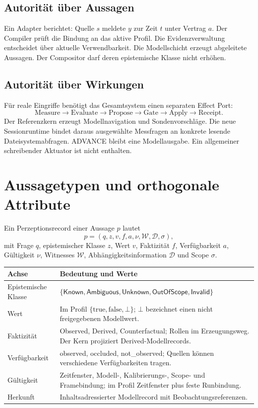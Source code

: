\documentclass[11pt,a4paper]{article}
\newcommand{\Known}{\ensuremath{\mathsf{Known}}}
\newcommand{\Unknown}{\ensuremath{\mathsf{Unknown}}}
\newcommand{\Ambiguous}{\ensuremath{\mathsf{Ambiguous}}}
\newcommand{\Invalid}{\ensuremath{\mathsf{Invalid}}}
\newcommand{\OOS}{\ensuremath{\mathsf{OutOfScope}}}
\newcommand{\nextsection}[2]{\clearpage{\color{accent}\small\textsf{#1}}\section{#2}}
\begin{document}
\subsection{Autorität über Aussagen}
Ein Adapter berichtet: Quelle $s$ meldete $y$ zur Zeit $t$ unter
Vertrag $a$. Der Compiler prüft die Bindung an das aktive Profil.
Die Evidenzverwaltung entscheidet über aktuelle Verwendbarkeit.
Die Modellschicht erzeugt abgeleitete Aussagen. Der Compositor darf
deren epistemische Klasse nicht erhöhen.

\subsection{Autorität über Wirkungen}
Für reale Eingriffe benötigt das Gesamtsystem einen separaten Effect Port:
\[
\mathrm{Measure}\to\mathrm{Evaluate}\to\mathrm{Propose}
\to\mathrm{Gate}\to\mathrm{Apply}\to\mathrm{Receipt}.
\]
Der Referenzkern erzeugt Modellnavigation und Sondenvorschläge.
Die neue Sessionruntime bindet daraus ausgewählte Messfragen an
konkrete lesende Dateisystemabfragen. ADVANCE bleibt eine
Modellausgabe. Ein allgemeiner schreibender Aktuator ist nicht enthalten.

\nextsection{03 / EPISTEMISCHE ABI}{Aussagetypen und orthogonale Attribute}
Ein Perzeptionsrecord einer Aussage $p$ lautet
\[
p=(q,z,v,f,a,\nu,\mathcal W,\mathcal D,\sigma),
\]
mit Frage $q$, epistemischer Klasse $z$, Wert $v$, Faktizität $f$,
Verfügbarkeit $a$, Gültigkeit $\nu$, Witnesses $\mathcal W$,
Abhängigkeitsinformation $\mathcal D$ und Scope $\sigma$.

\begin{tabularx}{\linewidth}{@{}lY@{}}
\toprule
Achse & Bedeutung und Werte\\\midrule
Epistemische Klasse & $\{\Known,\Ambiguous,\Unknown,\OOS,\Invalid\}$\\
Wert & Im Profil $\{\mathrm{true},\mathrm{false},\bot\}$;
$\bot$ bezeichnet einen nicht freigegebenen Modellwert.\\
Faktizität & Observed, Derived, Counterfactual; Rollen im
Erzeugungsweg. Der Kern projiziert Derived-Modellrecords.\\
Verfügbarkeit & observed, occluded, not\_observed; Quellen können
verschiedene Verfügbarkeiten tragen.\\
Gültigkeit & Zeitfenster, Modell-, Kalibrierungs-, Scope- und
Framebindung; im Profil Zeitfenster plus feste Runbindung.\\
Herkunft & Inhaltsadressierter Modellrecord mit Beobachtungsreferenzen.\\
\bottomrule
\end{tabularx}
\end{document}
